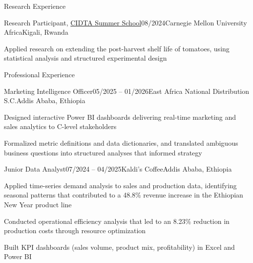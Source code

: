 \documentclass{resume}
\begin{document}
\begin{rSection}{Research Experience}
\begin{rSubsection}{Research Participant, \href{https://drive.google.com/file/d/1LSjzK0bLg10sZQME63zm0SyAg0EIO8bS/view?usp=sharing}{CIDTA Summer School}}{08/2024}{Carnegie Mellon University Africa}{Kigali, Rwanda}
\item Applied research on extending the post-harvest shelf life of tomatoes, using statistical analysis and structured experimental design
\end{rSubsection}

\end{rSection}

\begin{rSection}{Professional Experience}

\begin{rSubsection}{Marketing Intelligence Officer}{05/2025 -- 01/2026}{East Africa National Distribution S.C.}{Addis Ababa, Ethiopia}
\item Designed interactive Power BI dashboards delivering real-time marketing and sales analytics to C-level stakeholders
\item Formalized metric definitions and data dictionaries, and translated ambiguous business questions into structured analyses that informed strategy
\end{rSubsection}

\begin{rSubsection}{Junior Data Analyst}{07/2024 -- 04/2025}{Kaldi's Coffee}{Addis Ababa, Ethiopia}
\item Applied time-series demand analysis to sales and production data, identifying seasonal patterns that contributed to a 48.8\% revenue increase in the Ethiopian New Year product line
\item Conducted operational efficiency analysis that led to an 8.23\% reduction in production costs through resource optimization
\item Built KPI dashboards (sales volume, product mix, profitability) in Excel and Power BI
\end{rSubsection}

\end{rSection}
\end{document}
